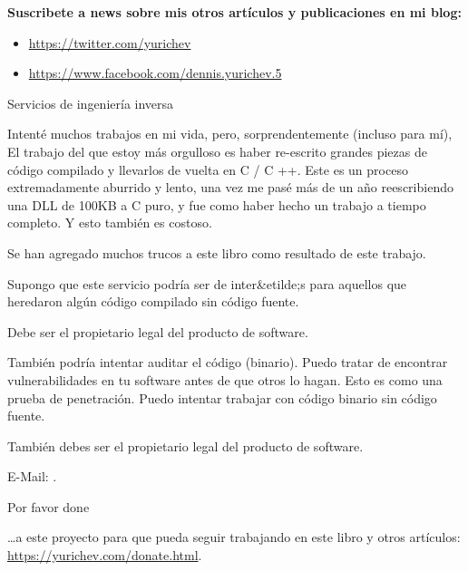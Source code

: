 
\vspace*{\fill}

\normalsize \textbf{Suscribete a news sobre mis otros artículos y publicaciones en mi blog:}

\bigskip
\bigskip
\bigskip

\begin{itemize}

\item \url{https://twitter.com/yurichev}

\item \url{https://www.facebook.com/dennis.yurichev.5}

\end{itemize}

\bigskip
\bigskip
\bigskip
\huge Servicios de ingeniería inversa
\normalsize

\bigskip
\bigskip
\bigskip

Intenté muchos trabajos en mi vida, pero, sorprendentemente (incluso para mí),
El trabajo del que estoy más orgulloso es haber re-escrito grandes piezas de código compilado y llevarlos de vuelta en C / C ++.
Este es un proceso extremadamente aburrido y lento, una vez me pasé más de un año reescribiendo una DLL de 100KB a C puro,
y fue como haber hecho un trabajo a tiempo completo.
Y esto también es costoso.

Se han agregado muchos trucos a este libro como resultado de este trabajo.

Supongo que este servicio podría ser de inter&etilde;s para aquellos que heredaron algún código compilado sin código fuente.

Debe ser el propietario legal del producto de software.

\bigskip

También podría intentar auditar el código (binario).
Puedo tratar de encontrar vulnerabilidades en tu software antes de que otros lo hagan.
Esto es como una prueba de penetración.
Puedo intentar trabajar con código binario sin código fuente.

También debes ser el propietario legal del producto de software.

E-Mail: \GTT{\EMAIL}.

\bigskip
\bigskip
\bigskip

\huge Por favor done
\normalsize

\bigskip
\bigskip
\bigskip

\dots a este proyecto para que pueda seguir trabajando en este libro y otros artículos: \\
\url{https://yurichev.com/donate.html}.

